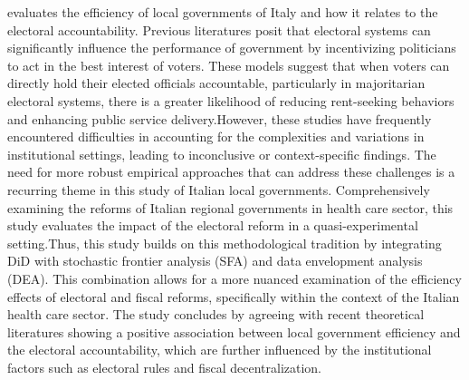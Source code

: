   evaluates the efficiency of local governments of Italy and how it relates to the electoral accountability. Previous literatures posit that electoral systems can significantly influence the performance of government by incentivizing politicians to act in the best interest of voters. These models suggest that when voters can directly hold their elected officials accountable, particularly in majoritarian electoral systems, there is a greater likelihood of reducing rent-seeking behaviors and enhancing public service delivery.However, these studies have frequently encountered difficulties in accounting for the complexities and variations in institutional settings, leading to inconclusive or context-specific findings. The need for more robust empirical approaches that can address these challenges is a recurring theme in this study of Italian local governments. Comprehensively examining the reforms of Italian regional governments in health care sector, this study evaluates the impact of the electoral reform in a quasi-experimental setting.Thus, this study builds on this methodological tradition by integrating DiD with stochastic frontier analysis (SFA) and data envelopment analysis (DEA). This combination allows for a more nuanced examination of the efficiency effects of electoral and fiscal reforms, specifically within the context of the Italian health care sector. The study concludes by agreeing with recent theoretical literatures showing a positive association between local government efficiency and the electoral accountability, which are further influenced by the institutional factors such as electoral rules and fiscal decentralization. \\
